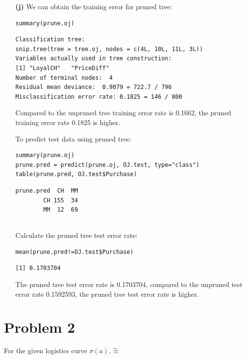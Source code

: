 \documentclass[twoside,11pt]{homework}
\begin{document}
\begin{enumerate}
\item[\textbf{(j)}] We can obtain the training error for pruned tree:

\begin{lstlisting}
summary(prune.oj)
\end{lstlisting}

\begin{verbatim}
Classification tree:
snip.tree(tree = tree.oj, nodes = c(4L, 10L, 11L, 3L))
Variables actually used in tree construction:
[1] "LoyalCH"   "PriceDiff"
Number of terminal nodes:  4 
Residual mean deviance:  0.9079 = 722.7 / 796 
Misclassification error rate: 0.1825 = 146 / 800 

\end{verbatim}

Compared to the unpruned tree training error rate is 0.1662, the pruned training error rate 0.1825 is higher.

To predict test data using pruned tree:

\begin{lstlisting}
summary(prune.oj)
prune.pred = predict(prune.oj, OJ.test, type="class")
table(prune.pred, OJ.test$Purchase)
\end{lstlisting}

\begin{verbatim}
prune.pred  CH  MM
        CH 155  34
        MM  12  69
        
\end{verbatim}

Calculate the pruned tree test error rate:

\begin{lstlisting}
mean(prune.pred!=OJ.test$Purchase)
\end{lstlisting}

\begin{verbatim}
[1] 0.1703704

\end{verbatim}

The pruned tree test error rate is 0.1703704, compared to the unpruned test error rate 0.1592593, the pruned tree test error rate is higher.

\end{enumerate}


\section*{Problem 2}

For the given logistics curve $\sigma(a)$, $\exists$:
\end{document}
